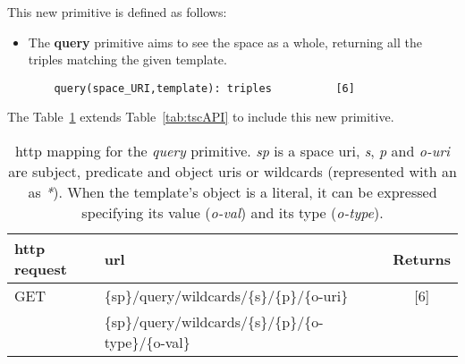 This new primitive is defined as follows:
\begin{itemize}
  \item The \textbf{query} primitive aims to see the space as a whole, returning all the triples matching the given template.
  
  \begin{lstlisting}
    query(space_URI,template): triples          [6]
  \end{lstlisting}
\end{itemize}


The Table~\ref{tab:queryAPI} extends Table~\ref{tab:tscAPI} to include this new primitive.

\begin{table} %
  \centering
  \caption {
    \acs{http} mapping for the \emph{query} primitive.
    \textit{sp} is a space \acs{uri}, \textit{s}, \textit{p} and \textit{o-uri} are subject, predicate and object \acsp{uri} or wildcards (represented with an as \textit{*}).
    When the template's object is a literal, it can be expressed specifying its value (\textit{o-val}) and its type (\textit{o-type}).
    \medskip
  }
  \begin{tabular}{llc}
      \hline
      \acs{http} request & \acs{url} & Returns \\
      \hline
      GET & \{sp\}/query/wildcards/\{s\}/\{p\}/\{o-uri\} &  [6] \\
      & \{sp\}/query/wildcards/\{s\}/\{p\}/\{o-type\}/\{o-val\} & \\
      \hline
  \end{tabular}
  \label{tab:queryAPI}
\end{table}


